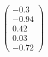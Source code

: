 \documentclass[preview]{standalone}
\begin{document}
\begin{align*}
\begin{pmatrix} -0.3 \\ -0.94 \\ 0.42 \\ 0.03 \\ -0.72 \end{pmatrix}
\end{align*}
\end{document}
